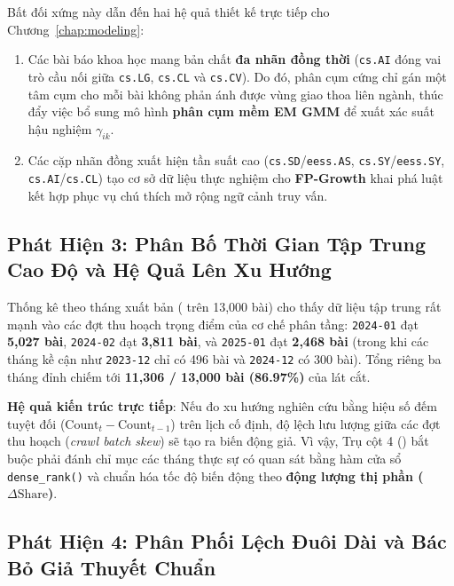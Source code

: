 Bất đối xứng này dẫn đến hai hệ quả thiết kế trực tiếp cho Chương~\ref{chap:modeling}:
\begin{enumerate}[label=\textbf{\arabic*.}]
  \item Các bài báo khoa học mang bản chất \textbf{đa nhãn đồng thời} (\texttt{cs.AI} đóng vai trò cầu nối giữa \texttt{cs.LG}, \texttt{cs.CL} và \texttt{cs.CV}). Do đó, phân cụm cứng chỉ gán một tâm cụm cho mỗi bài không phản ánh được vùng giao thoa liên ngành, thúc đẩy việc bổ sung mô hình \textbf{phân cụm mềm EM GMM} để xuất xác suất hậu nghiệm $\gamma_{ik}$.
  \item Các cặp nhãn đồng xuất hiện tần suất cao (\texttt{cs.SD}/\texttt{eess.AS}, \texttt{cs.SY}/\texttt{eess.SY}, \texttt{cs.AI}/\texttt{cs.CL}) tạo cơ sở dữ liệu thực nghiệm cho \textbf{FP-Growth} khai phá luật kết hợp phục vụ chú thích mở rộng ngữ cảnh truy vấn.
\end{enumerate}

\subsection{Phát Hiện 3: Phân Bố Thời Gian Tập Trung Cao Độ và Hệ Quả Lên Xu Hướng}
\label{sec:ch3_insight3}

Thống kê theo tháng xuất bản ( trên 13,000 bài) cho thấy dữ liệu tập trung rất mạnh vào các đợt thu hoạch trọng điểm của cơ chế phân tầng: \texttt{2024-01} đạt \textbf{5,027 bài}, \texttt{2024-02} đạt \textbf{3,811 bài}, và \texttt{2025-01} đạt \textbf{2,468 bài} (trong khi các tháng kề cận như \texttt{2023-12} chỉ có 496 bài và \texttt{2024-12} có 300 bài). Tổng riêng ba tháng đỉnh chiếm tới \textbf{11,306 / 13,000 bài (86.97\%)} của lát cắt.

\textbf{Hệ quả kiến trúc trực tiếp}: Nếu đo xu hướng nghiên cứu bằng hiệu số đếm tuyệt đối ($\text{Count}_t - \text{Count}_{t-1}$) trên lịch cố định, độ lệch lưu lượng giữa các đợt thu hoạch (\textit{crawl batch skew}) sẽ tạo ra biến động giả. Vì vậy, Trụ cột 4 () bắt buộc phải đánh chỉ mục các tháng thực sự có quan sát bằng hàm cửa sổ \texttt{dense\_rank()} và chuẩn hóa tốc độ biến động theo \textbf{động lượng thị phần ($\Delta\text{Share}$)}.

\subsection{Phát Hiện 4: Phân Phối Lệch Đuôi Dài và Bác Bỏ Giả Thuyết Chuẩn}
\label{sec:ch3_insight4}


